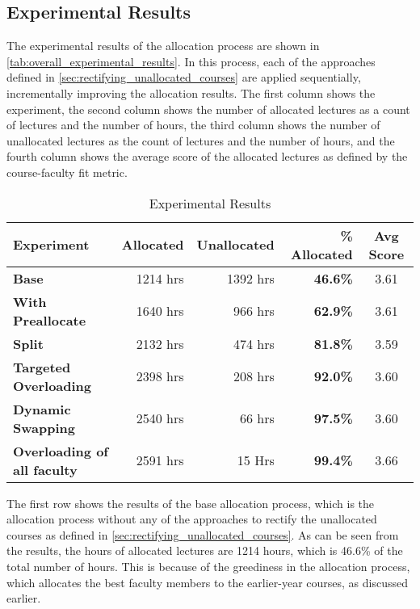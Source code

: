 \subsection{Experimental Results}

The experimental results of the allocation process are shown in \autoref{tab:overall_experimental_results}. In this process, each of the approaches defined in \autoref{sec:rectifying_unallocated_courses} are applied sequentially, incrementally improving the allocation results. The first column shows the experiment, the second column shows the number of allocated lectures as a count of lectures and the number of hours, the third column shows the number of unallocated lectures as the count of lectures and the number of hours, and the fourth column shows the average score of the allocated lectures as defined by the course-faculty fit metric.

\begin{table}[H]
  \centering
  \begin{tabular}{|l|r|r|r|c|}
    \hline
    \textbf{Experiment}                 & \textbf{Allocated} & \textbf{Unallocated} & \textbf{\% Allocated} & \textbf{Avg Score} \\ \hline
    \textbf{Base}                       & 1214 hrs           & 1392 hrs             & \textbf{46.6\%}       & 3.61               \\ \hline
    \textbf{With Preallocate}           & 1640 hrs           & 966 hrs              & \textbf{62.9\%}       & 3.61               \\ \hline
    \textbf{Split}                      & 2132 hrs           & 474 hrs              & \textbf{81.8\%}       & 3.59               \\ \hline
    \textbf{Targeted Overloading}       & 2398 hrs           & 208 hrs              & \textbf{92.0\%}       & 3.60               \\ \hline
    \textbf{Dynamic Swapping}           & 2540 hrs           & 66 hrs               & \textbf{97.5\%}       & 3.60               \\ \hline
    \textbf{Overloading of all faculty} & 2591 hrs           & 15 Hrs               & \textbf{99.4\%}       & 3.66               \\ \hline
  \end{tabular}
  \caption{Experimental Results}
  \label{tab:overall_experimental_results}
\end{table}

The first row shows the results of the base allocation process, which is the allocation process without any of the approaches to rectify the unallocated courses as defined in  \autoref{sec:rectifying_unallocated_courses}. As can be seen from the results, the hours of allocated lectures are 1214 hours, which is 46.6\% of the total number of hours. This is because of the greediness in the allocation process, which allocates the best faculty members to the earlier-year courses, as discussed earlier.


